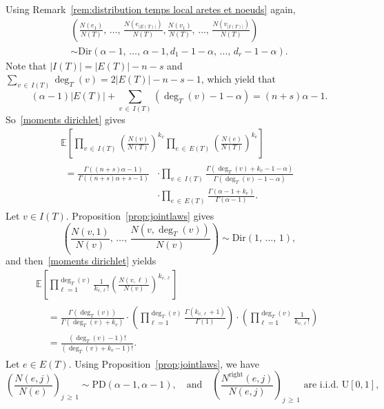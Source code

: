 \documentclass[10pt]{amsart}
\theoremstyle{definition}\newtheorem{defi}[theo]{Definition}\newtheorem{rema}[theo]{Remark}\newtheorem{exam}[theo]{Example}\newtheorem{exem}[theo]{Example}\newtheorem{nota}[theo]{Notation}
\newcommand{\Ec}[1]{\mathbb{E} \left[#1\right]}
\newcommand{\abs}[1]{\left\lvert#1\right\rvert}
\newcommand{\PD}{\mathrm{PD}}
\newcommand{\Rightll}{\mathrm{right}}
\newcommand{\rmU}{\mathrm{U}}
\newcommand{\Dir}{\mathrm{Dir}}
\begin{document}
Using Remark~\ref{rem:distribution temps local aretes et noeuds} again,
\begin{multline*}
\left(\frac{N(e_1)}{N(T)},\,\dots,\,\frac{N\left(e_{\abs{E(T)}}\right)}{N(T)},\frac{N(v_1)}{N(T)},\,\dots,\,\frac{N\left(v_{\abs{I(T)}}\right)}{N(T)}\right) \\
\sim \Dir\left(\alpha-1,\,\dots,\,\alpha-1,d_1-1-\alpha,\, \dots,\,d_r-1-\alpha\right).
\end{multline*}
Note that $|I(T)| = |E(T)| - n - s$ and $\sum_{v\,\in\,I(T)} \deg_T(v) = 2 |E(T)| - n - s -1$, which yield that
\[
(\alpha-1)|E(T)| + \sum_{v\,\in\,I(T)} \left(\deg_T(v) - 1 - \alpha\right) = (n+s) \alpha - 1.
\]
So~\eqref{moments dirichlet} gives
\begin{multline*}
\Ec{\prod_{v\,\in\,I(T)}\left(\frac{N(v)}{N(T)}\right)^{k_v} \prod_{e\,\in\,E(T)}\left(\frac{N(e)}{N(T)}\right)^{k_e} }\\
\begin{aligned}
 =\frac{\Gamma\left((n+s)\alpha-1\right)}{\Gamma\left((n+s)\alpha+s-1\right)} &\cdot\prod_{v\,\in\,I(T)}\frac{\Gamma\left(\deg_T(v)+k_v-1-\alpha\right)}{\Gamma\left(\deg_T(v)-1-\alpha\right)}\\ &\cdot \prod_{e\,\in\,E(T)}\frac{\Gamma\left(\alpha-1+k_e\right)}{\Gamma(\alpha-1)}.
\end{aligned}
\end{multline*}
Let $v\in I(T)$. Proposition~\ref{prop:jointlaws} gives
\[
\left(\frac{N(v,1)}{N(v)},\,\dots,\,\frac{N\left(v,\deg_T(v)\right)}{N(v)}\right)\sim \Dir(1,\,\dots,\,1),
\]
and then~\eqref{moments dirichlet} yields
\begin{multline*}
\Ec{\prod_{\ell=1}^{\deg_T(v)}\frac{1}{k_{v,\ell}!}\left(\frac{N(v,\ell)}{N(v)}\right)^{k_{v,\ell}}}\\
\begin{aligned}
&=\frac{\Gamma\left(\deg_T(v)\right)}{\Gamma\left(\deg_T(v)+k_v\right)}\cdot \left(\prod_{\ell =1}^{\deg_T(v)}\frac{\Gamma\left(k_{v,\ell}+1\right)}{\Gamma(1)}\right)\cdot \left(\prod_{\ell=1}^{\deg_T(v)} \frac{1}{k_{v,\ell}!}\right)\\
&=\frac{\left(\deg_T(v)-1\right)!}{\left(\deg_T(v)+k_v-1\right)!}.
\end{aligned}
\end{multline*}
Let $e\in E(T)$. Using Proposition~\ref{prop:jointlaws}, we have
\[
\left(\frac{N(e,j)}{N(e)}\right)_{j\,\geq\,1}\sim \PD\left(\alpha-1,\alpha-1\right), \quad \text{and} \quad \left(\frac{N^{\Rightll}(e,j)}{N(e,j)}\right)_{j\,\geq\,1} \text{ are i.i.d.\ }\rmU[0,1],
\]
\end{document}

